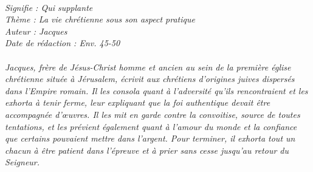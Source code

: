 \BFont
\noindent\hrulefill
{\footnotesize
\textit{
\bigskip
{\centering{}
\\Signifie : Qui supplante
\\Thème : La vie chrétienne sous son aspect pratique
\\Auteur : Jacques
\\Date de rédaction : Env. 45-50\\}
}
\textit{
\\Jacques, frère de Jésus-Christ homme et ancien au sein de la première église chrétienne située à Jérusalem, écrivit aux chrétiens d’origines juives dispersés dans l’Empire romain. Il les consola quant à l’adversité qu’ils rencontraient et les exhorta à tenir ferme, leur expliquant que la foi authentique devait être accompagnée d’œuvres. Il les mit en garde contre la convoitise, source de toutes tentations, et les prévient également quant à l’amour du monde et la confiance que certains pouvaient mettre dans l’argent. Pour terminer, il exhorta tout un chacun à être patient dans l’épreuve et à prier sans cesse jusqu’au retour du Seigneur.\bigskip
}
}
\par\nobreak\noindent\hrulefill
